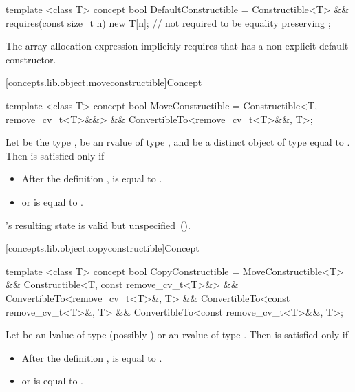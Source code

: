 %
\begin{itemdecl}
template <class T>
concept bool DefaultConstructible =
  Constructible<T> &&
  requires(const size_t n) {
    new T[n]{}; // not required to be equality preserving
  };
\end{itemdecl}

\pnum
\enternote The array allocation expression  implicitly
requires that  has a non-explicit default constructor. \exitnote

[concepts.lib.object.moveconstructible]{Concept }

%
\begin{itemdecl}
template <class T>
concept bool MoveConstructible =
  Constructible<T, remove_cv_t<T>&&> &&
  ConvertibleTo<remove_cv_t<T>&&, T>;
\end{itemdecl}

\begin{itemdescr}
\pnum
Let  be the type ,
 be an rvalue of type ,
and  be a distinct object of type  equal to .
Then  is satisfied only if

\begin{itemize}
\item After the definition ,  is equal to .
\item {} or  is equal to .
\end{itemize}

\pnum
{}'s resulting state is valid but unspecified~().

\end{itemdescr}

[concepts.lib.object.copyconstructible]{Concept }

%
\begin{itemdecl}
template <class T>
concept bool CopyConstructible =
  MoveConstructible<T> &&
  Constructible<T, const remove_cv_t<T>&> &&
  ConvertibleTo<remove_cv_t<T>&, T> &&
  ConvertibleTo<const remove_cv_t<T>&, T> &&
  ConvertibleTo<const remove_cv_t<T>&&, T>;
\end{itemdecl}

\begin{itemdescr}
\pnum
Let  be an lvalue of type (possibly )
 or an rvalue of type .
Then  is satisfied only if

\begin{itemize}
\item After the definition ,  is equal
to .
\item {} or  is equal
to .
\end{itemize}

\end{itemdescr}

